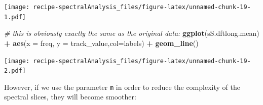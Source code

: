 \documentclass[]{book}
\newenvironment{Shaded}{\begin{snugshade}}{\end{snugshade}}
\newcommand{\CommentTok}[1]{\textcolor[rgb]{0.56,0.35,0.01}{\textit{#1}}}
\newcommand{\DataTypeTok}[1]{\textcolor[rgb]{0.13,0.29,0.53}{#1}}
\newcommand{\KeywordTok}[1]{\textcolor[rgb]{0.13,0.29,0.53}{\textbf{#1}}}
\newcommand{\NormalTok}[1]{#1}
\newcommand{\OperatorTok}[1]{\textcolor[rgb]{0.81,0.36,0.00}{\textbf{#1}}}
\newcommand{\StringTok}[1]{\textcolor[rgb]{0.31,0.60,0.02}{#1}}
\begin{document}
\begin{Shaded}
\end{Shaded}

\texttt{[image: recipe-spectralAnalysis\_files/figure-latex/unnamed-chunk-19-1.pdf]}

\begin{Shaded}
\begin{Highlighting}[]
\CommentTok{# this is obviously exactly the same as the original data: }
\KeywordTok{ggplot}\NormalTok{(sS.dftlong.mean) }\OperatorTok{+}
\StringTok{  }\KeywordTok{aes}\NormalTok{(}\DataTypeTok{x =}\NormalTok{ freq, }\DataTypeTok{y =}\NormalTok{ track_value,}\DataTypeTok{col=}\NormalTok{labels) }\OperatorTok{+}
\StringTok{  }\KeywordTok{geom_line}\NormalTok{()}
\end{Highlighting}
\end{Shaded}

\texttt{[image: recipe-spectralAnalysis\_files/figure-latex/unnamed-chunk-19-2.pdf]}

However, if we use the parameter \texttt{m} in order to reduce the complexity of the spectral slices, they will become smoother:
\end{document}
